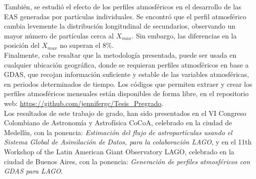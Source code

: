 También, se estudió el efecto de los perfiles atmosféricos en el desarrollo de las EAS generadas por partículas individuales. Se encontró que el perfil atmosférico cambia levemente la distribución longitudinal de secundarios, observando un mayor número de partículas cerca al $X_{max}$. Sin embargo, las diferencias en la posición del $X_{max}$ no superan el 8$\%$.\\

Finalmente, cabe resaltar que la metodología presentada, puede ser usada en cualquier ubicación geográfica, donde se requieran perfiles atmosféricos en base a GDAS, que recojan información suficiente y estable de las variables atmosféricas, en periodos determinados de tiempo. Los códigos que permiten extraer y crear los perfiles atmosféricos mensuales están disponibles de forma libre, en el repositorio web: \url{https://github.com/jennifergc/Tesis_Pregrado}. \\


Los resultados de este trabajo de grado, han sido presentados en  el VI Congreso Colombiano de Astronomía y Astrofísica CoCoA, celebrado en la ciudad de Medellín, con la ponencia: \textit{Estimación del flujo de astropartículas usando el Sistema Global de Asimilación de Datos, para la colaboración LAGO}, y en el 11th Workshop of the Latin American Giant Observatory LAGO, celebrado en la ciudad de Buenos Aires, con la ponencia: \textit{Generación de perfiles atmosféricos con GDAS para LAGO}.

